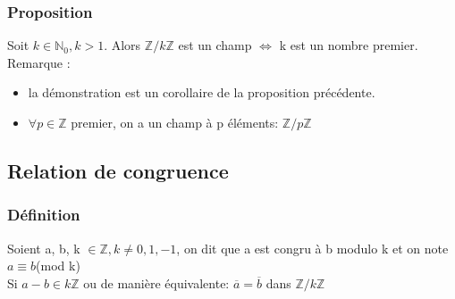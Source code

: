 \documentclass[11pt]{article}
\begin{document}
			\subsubsection{Proposition}
			Soit $k \in \mathbb{N}_0, k > 1$.  Alors $\mathbb{Z}/k\mathbb{Z}$ est un champ $\Leftrightarrow$ k est un nombre premier.\\
			Remarque :
			\begin{itemize}
			 	\item la démonstration est un corollaire de la proposition précédente.
			 	\item $\forall p \in \mathbb{Z}$ premier, on a un champ à p éléments: $\mathbb{Z}/p\mathbb{Z}$
			\end{itemize}
			
		\subsection{Relation de congruence}
			\subsubsection{Définition}
				Soient a, b, k $\in \mathbb{Z}, k \neq 0, 1, -1$, on dit que a est congru à b modulo k et on note\\
				$a\equiv b$(mod k)\\
				Si $a-b \in k\mathbb{Z}$ ou de manière équivalente: $\overline{a} = \overline{b}$ dans $\mathbb{Z}/k\mathbb{Z}$
			
\end{document}
